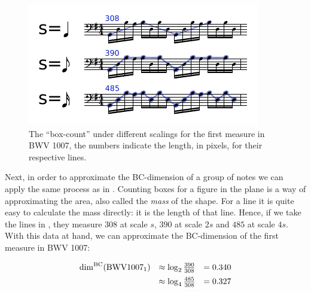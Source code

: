 \begin{figure}
  \includegraphics[width=\linewidth]{src/img/musical-scaling-example.pdf}
  \caption{The ``box-count'' under different scalings for the first measure in BWV 1007,
the numbers indicate the length, in pixels, for their respective lines.}
  \label{fig:egscalingmusic}
\end{figure}


  Next, in order to approximate the BC-dimension of a group of notes
we can apply the same process as in . Counting boxes for
a figure in the plane is a way of approximating the area, also called
the \emph{mass} of the shape. For a line it is quite easy to calculate
the mass directly: it is the length of that line. Hence, if we take 
the lines in , they measure $308$ at scale
$s$, $390$ at scale $2s$ and $485$ at scale $4s$. With this data
at hand, we can approximate the BC-dimension of the first measure in
BWV 1007:

\[
\begin{array}{l l l}
 \mathrm{dim}^{\mathrm{BC}} (\mathrm{BWV1007}_1)  &\approx \log_2 \frac{390}{308} &= 0.340 \\[.5em]
                              &\approx \log_4 \frac{485}{308} &= 0.327 \\
\end{array}
\]



